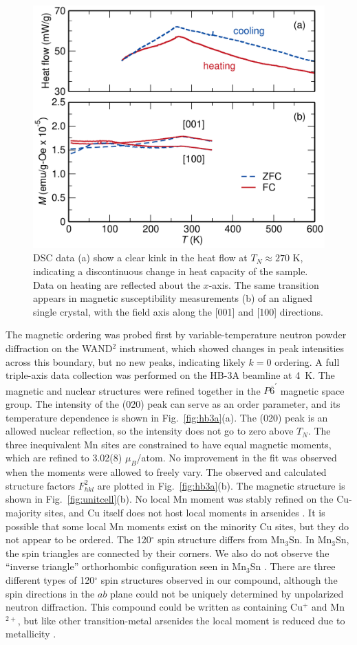 \documentclass[letterpaper,10pt,doublespacing,edeposit]{uiucthesis2020}
\begin{document}
\begin{mainmatter}
\begin{figure}
\centering\includegraphics[width=0.6\columnwidth]{figures/ch5/dsc-mpms_norm_cropped.pdf}
\caption{
DSC data (a) show a clear kink in the heat flow at $T_N \approx 270$ K, indicating a discontinuous change in heat capacity of the sample. Data on heating are reflected about the $x$-axis. The same transition appears in magnetic susceptibility measurements (b) of an aligned single crystal, with the field axis along the [001] and [100] directions.
} 
\label{fig:dsc-mpms}
\end{figure}

The magnetic ordering was probed first by variable-temperature neutron powder diffraction
on the WAND$^2$ instrument, which showed changes in peak intensities across this boundary, but no new peaks, indicating likely $k = 0$ ordering.
A full triple-axis data collection was performed on the HB-3A beamline at 4~K.
The magnetic and nuclear structures were refined together in the $P\overline{6}^\prime$ magnetic space group. 
The intensity of the (020) peak can serve as an order parameter, and its temperature dependence is shown in Fig.\ \ref{fig:hb3a}(a).
The (020) peak is an allowed nuclear reflection, so the intensity does not go to zero above $T_N$.
The three inequivalent Mn sites are constrained to have equal magnetic moments, which are refined to 3.02(8) $\mu_B$/atom.
No improvement in the fit was observed when the moments were allowed to freely vary.
The observed and calculated structure factors $F_{hkl}^2$ are plotted in Fig.\ \ref{fig:hb3a}(b).
The magnetic structure is shown in Fig.\ \ref{fig:unitcell}(b). 
No local Mn moment was stably refined on the Cu-majority sites, and Cu itself does not host local moments in arsenides \cite{pauwels_electrical_1973,sampathkumaran_enhanced_2003,sengupta_magnetic_2005}.
It is possible that some local Mn moments exist on the minority Cu sites, but they do not appear to be ordered.
{\color{black}The 120$^\circ$ spin structure differs from Mn$_3$Sn. In Mn$_3$Sn, the spin triangles are connected by their corners. We also do not observe the ``inverse triangle'' orthorhombic configuration seen in Mn$_3$Sn \cite{Brown_1990}. There are three different types of 120$^\circ$ spin structures observed in our compound, although the spin directions in the $ab$ plane could not be uniquely determined by unpolarized neutron diffraction.}
This compound could be written as containing Cu$^+$ and Mn$^{2+}$, but like other transition-metal arsenides the local moment is reduced due to metallicity \cite{Katsuraki1966,Pytlik1985}.


\end{mainmatter}
\end{document}
